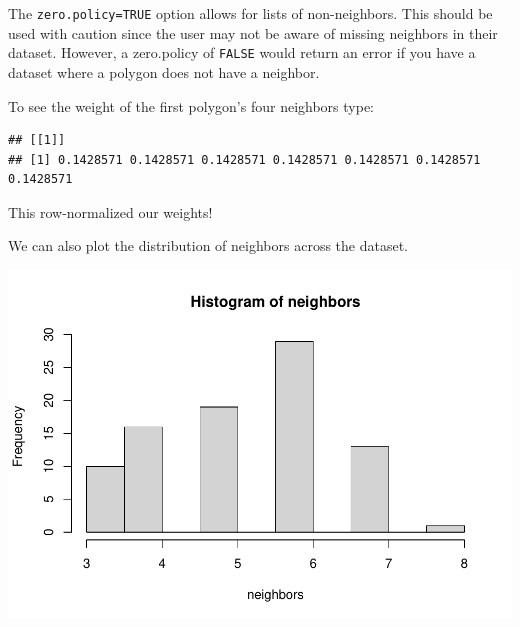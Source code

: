 \documentclass[]{article}
\newenvironment{Shaded}{\begin{snugshade}}{\end{snugshade}}
\newcommand{\CommentTok}[1]{\textcolor[rgb]{0.56,0.35,0.01}{\textit{#1}}}
\newcommand{\DecValTok}[1]{\textcolor[rgb]{0.00,0.00,0.81}{#1}}
\newcommand{\FunctionTok}[1]{\textcolor[rgb]{0.13,0.29,0.53}{\textbf{#1}}}
\newcommand{\NormalTok}[1]{#1}
\newcommand{\OtherTok}[1]{\textcolor[rgb]{0.56,0.35,0.01}{#1}}
\newcommand{\SpecialCharTok}[1]{\textcolor[rgb]{0.81,0.36,0.00}{\textbf{#1}}}
\newcommand{\StringTok}[1]{\textcolor[rgb]{0.31,0.60,0.02}{#1}}
\begin{document}
The \texttt{zero.policy=TRUE} option allows for lists of non-neighbors.
This should be used with caution since the user may not be aware of
missing neighbors in their dataset. However, a zero.policy of
\texttt{FALSE} would return an error if you have a dataset where a
polygon does not have a neighbor.

To see the weight of the first polygon's four neighbors type:

\begin{Shaded}
\end{Shaded}

\begin{verbatim}
## [[1]]
## [1] 0.1428571 0.1428571 0.1428571 0.1428571 0.1428571 0.1428571 0.1428571
\end{verbatim}

This row-normalized our weights!

We can also plot the distribution of neighbors across the dataset.

\begin{Shaded}
\end{Shaded}

\includegraphics{lab03_files/figure-latex/plotneighbors-1.pdf}
\end{document}
